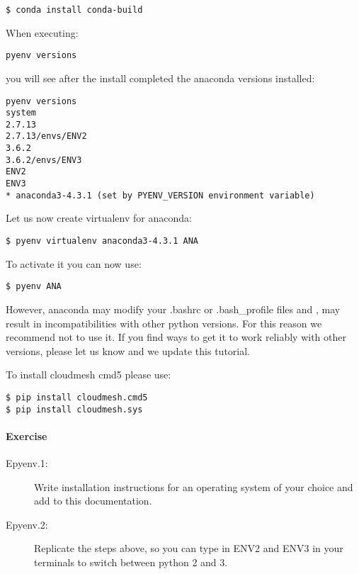 \begin{verbatim}
$ conda install conda-build
\end{verbatim}

When executing:

\begin{verbatim}
pyenv versions
\end{verbatim}

you will see after the install completed the anaconda versions
installed:

\begin{verbatim}
pyenv versions
system
2.7.13
2.7.13/envs/ENV2
3.6.2
3.6.2/envs/ENV3
ENV2 
ENV3
* anaconda3-4.3.1 (set by PYENV_VERSION environment variable)
\end{verbatim}

Let us now create virtualenv for anaconda:

\begin{verbatim}
$ pyenv virtualenv anaconda3-4.3.1 ANA
\end{verbatim}

To activate it you can now use:

\begin{verbatim}
$ pyenv ANA
\end{verbatim}

However, anaconda may modify your .bashrc or .bash\_profile files and ,
may result in incompatibilities with other python versions. For this
reason we recommend not to use it. If you find ways to get it to work
reliably with other versions, please let us know and we update this
tutorial.

To install cloudmesh cmd5 please use:

\begin{verbatim}
$ pip install cloudmesh.cmd5
$ pip install cloudmesh.sys
\end{verbatim}

\paragraph{Exercise}\label{exercise}

\begin{description}
\item[Epyenv.1:]
Write installation instructions for an operating system of your choice
and add to this documentation.
\item[Epyenv.2:]
Replicate the steps above, so you can type in ENV2 and ENV3 in your
terminals to switch between python 2 and 3.
\end{description}

